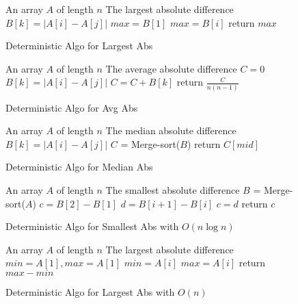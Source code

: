 \documentclass{article}
\begin{document}
\begin{figure*}[!htbp]
  \centering
  \begin{algorithmic}
    \REQUIRE An array $A$ of length $n$
\ENSURE The largest absolute difference
		\STATE $B[k] = |A[i] - A[j]|$
	\ENDFOR
\ENDFOR
\STATE $max = B[1]$
		\STATE $max = B[i]$
	\ENDIF
\ENDFOR
\STATE return $max$
  \end{algorithmic}
  \caption{Deterministic Algo for Largest Abs}
  \label{fig:deter-largest}
\end{figure*}

\begin{figure*}[!htbp]
  \centering
  \begin{algorithmic}
    \REQUIRE An array $A$ of length $n$
\ENSURE The average absolute difference
\STATE $C = 0$
		\STATE $B[k] = |A[i] - A[j]|$
		\STATE $C = C + B[k]$
	\ENDFOR
\ENDFOR
\STATE return $\frac{C}{n(n-1)}$
  \end{algorithmic}
  \caption{Deterministic Algo for Avg Abs}
  \label{fig:deter-avg}
\end{figure*}

\begin{figure*}[!htbp]
  \centering
  \begin{algorithmic}
    \REQUIRE An array $A$ of length $n$
\ENSURE The median absolute difference
		\STATE $B[k] = |A[i] - A[j]|$
	\ENDFOR
\ENDFOR
\STATE $C$ = Merge-sort($B$)
\STATE return $C[mid]$
  \end{algorithmic}
  \caption{Deterministic Algo for Median Abs}
  \label{fig:deter-median}
\end{figure*}

\begin{figure*}[!htbp]
  \centering
  \begin{algorithmic}
    \REQUIRE An array $A$ of length $n$
\ENSURE The smallest absolute difference
\STATE $B$ = Merge-sort($A$)
\STATE $c = B[2]-B[1]$
	\STATE $d = B[i+1] - B[i]$
		\STATE $c = d$
	\ENDIF
\ENDFOR
\STATE return $c$
  \end{algorithmic}
  \caption{Deterministic Algo for Smallest Abs with $O(n\log n)$}
  \label{fig:deter-smallest-1}
\end{figure*}

\begin{figure*}[!htbp]
  \centering
  \begin{algorithmic}
    \REQUIRE An array $A$ of length $n$
\ENSURE The largest absolute difference
\STATE $min = A[1], max = A[1]$
		\STATE $min = A[i]$
	\ENDIF
		\STATE $max = A[i]$
	\ENDIF
\ENDFOR
\STATE return $max - min$
  \end{algorithmic}
  \caption{Deterministic Algo for Largest Abs with $O(n)$}
  \label{fig:deter-largest-1}
\end{figure*}
\end{document}

